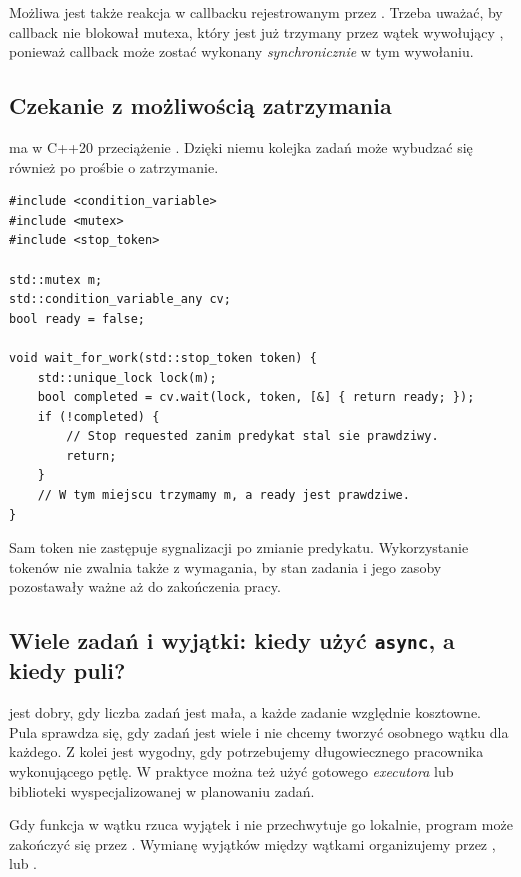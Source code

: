 Możliwa jest także reakcja w callbacku rejestrowanym przez
. Trzeba uważać, by callback nie blokował
mutexa, który jest już trzymany przez wątek wywołujący
, ponieważ callback może zostać wykonany
\emph{synchronicznie} w tym wywołaniu.

\subsection{Czekanie z możliwością zatrzymania}

 ma w C++20 przeciążenie
. Dzięki niemu kolejka zadań może
wybudzać się również po prośbie o zatrzymanie.

\begin{lstlisting}[caption={Oczekiwanie na stan lub anulowanie w C++20.}]
#include <condition_variable>
#include <mutex>
#include <stop_token>

std::mutex m;
std::condition_variable_any cv;
bool ready = false;

void wait_for_work(std::stop_token token) {
    std::unique_lock lock(m);
    bool completed = cv.wait(lock, token, [&] { return ready; });
    if (!completed) {
        // Stop requested zanim predykat stal sie prawdziwy.
        return;
    }
    // W tym miejscu trzymamy m, a ready jest prawdziwe.
}
\end{lstlisting}

Sam token nie zastępuje sygnalizacji  po zmianie
predykatu. Wykorzystanie tokenów nie zwalnia także z wymagania, by
stan zadania i jego zasoby pozostawały ważne aż do zakończenia pracy.

\subsection{Wiele zadań i wyjątki: kiedy użyć \texttt{async}, a kiedy puli?}

 jest dobry, gdy liczba zadań
jest mała, a każde zadanie względnie kosztowne. Pula sprawdza się,
gdy zadań jest wiele i nie chcemy tworzyć osobnego wątku dla każdego.
Z kolei  jest wygodny, gdy potrzebujemy długowiecznego
pracownika wykonującego pętlę. W praktyce można też użyć gotowego
\emph{executora} lub biblioteki wyspecjalizowanej w planowaniu zadań.

Gdy funkcja w wątku rzuca wyjątek i nie przechwytuje go lokalnie,
program może zakończyć się przez . Wymianę
wyjątków między wątkami organizujemy przez ,
 lub .

